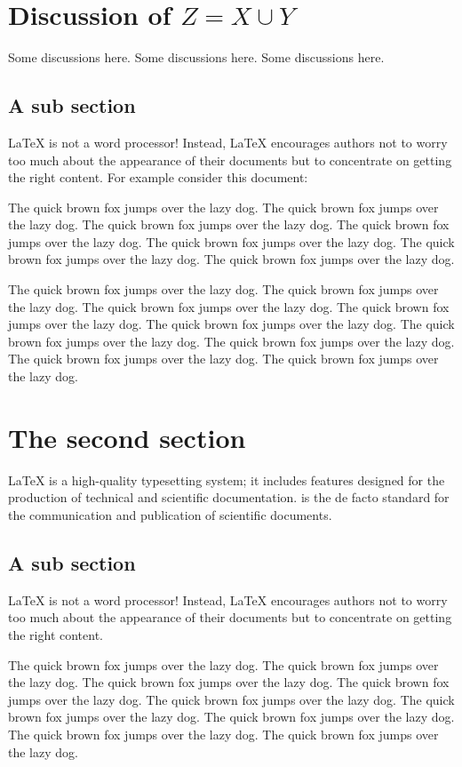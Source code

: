 \documentclass[openany,twoside,12pt]{book}
\theoremstyle{plain}
\numberwithin{equation}{chapter}
\numberwithin{figure}{chapter}
\numberwithin{table}{chapter}
\begin{document}
\section{Discussion of \texorpdfstring{{\boldmath$Z=X \cup Y$}}{Z = X union Y}}
\label{sec:discussion}

Some discussions here. Some discussions here. Some discussions here.

\subsection{A sub section}
LaTeX is not a word processor! Instead, LaTeX encourages authors not to worry too much about the appearance of their documents but to concentrate on getting the right content. For example consider this document:

The quick brown fox jumps over the lazy dog. The quick brown fox jumps over the lazy dog. The quick brown fox jumps over the lazy dog. The quick brown fox jumps over the lazy dog. The quick brown fox jumps over the lazy dog. The quick brown fox jumps over the lazy dog. The quick brown fox jumps over the lazy dog.

The quick brown fox jumps over the lazy dog. The quick brown fox jumps over the lazy dog. The quick brown fox jumps over the lazy dog. The quick brown fox jumps over the lazy dog. The quick brown fox jumps over the lazy dog. The quick brown fox jumps over the lazy dog. The quick brown fox jumps over the lazy dog. The quick brown fox jumps over the lazy dog. The quick brown fox jumps over the lazy dog.


\section{The second section}
LaTeX is a high-quality typesetting system; it includes features designed for the production of technical and scientific documentation.  is the de facto standard for the communication and publication of scientific documents.

\subsection{A sub section}
LaTeX is not a word processor! Instead, LaTeX encourages authors not to worry too much about the appearance of their documents but to concentrate on getting the right content.

The quick brown fox jumps over the lazy dog. The quick brown fox jumps over the lazy dog. The quick brown fox jumps over the lazy dog. The quick brown fox jumps over the lazy dog. The quick brown fox jumps over the lazy dog. The quick brown fox jumps over the lazy dog. The quick brown fox jumps over the lazy dog. The quick brown fox jumps over the lazy dog. The quick brown fox jumps over the lazy dog.
\end{document}
